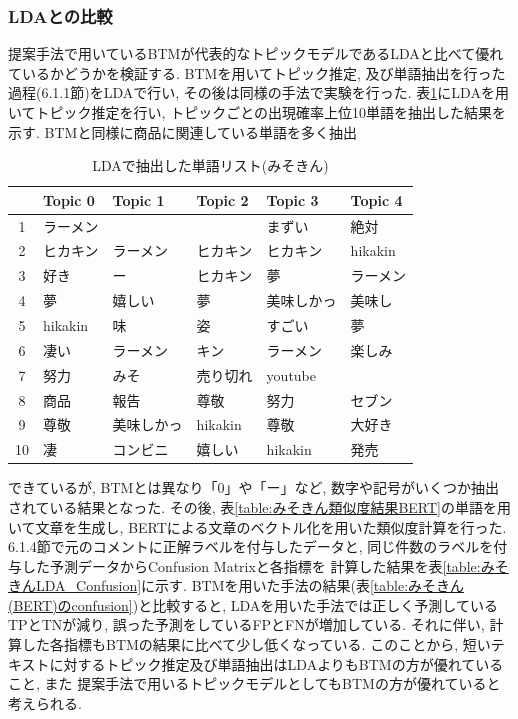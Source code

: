 \documentclass{ltjarticle}
\begin{document}
\subsubsection{LDAとの比較}
提案手法で用いているBTMが代表的なトピックモデルであるLDAと比べて優れているかどうかを検証する. 
BTMを用いてトピック推定, 及び単語抽出を行った過程(6.1.1節)をLDAで行い, その後は同様の手法で実験を行った. 
表\ref{table:みそきん単語結果LDA}にLDAを用いてトピック推定を行い, トピックごとの出現確率上位10単語を抽出した結果を示す. 
BTMと同様に商品に関連している単語を多く抽出
\begin{table}[h]
    \caption{LDAで抽出した単語リスト(みそきん)}
    \vspace{5truept}

    \centering
    \begin{tabular}{|c|>{\centering}p{6em}|>{\centering}p{6em}|>{\centering}p{6em}|>{\centering}p{6em}|>{\centering\arraybackslash}p{6em}|}
        \hline
        & Topic 0 & Topic 1 & Topic 2 & Topic 3 & Topic 4\\
        \hline\hline
        1 & ラーメン & 0 & 0 & まずい & 絶対\\
        \hline
        2 & ヒカキン & ラーメン & ヒカキン & ヒカキン & hikakin\\
        \hline
        3 & 好き & ー & ヒカキン & 夢 & ラーメン\\
        \hline
        4 & 夢 & 嬉しい & 夢 & 美味しかっ & 美味し\\
        \hline
        5 & hikakin & 味 & 姿 & すごい & 夢\\
        \hline
        6 & 凄い & ラーメン & キン & ラーメン & 楽しみ\\
        \hline
        7 & 努力 & みそ & 売り切れ & youtube & 0\\
        \hline
        8 & 商品 & 報告 & 尊敬 & 努力 & セブン\\
        \hline
        9 & 尊敬 & 美味しかっ & hikakin & 尊敬 & 大好き\\
        \hline
        10 & 凄 & コンビニ & 嬉しい & hikakin & 発売\\
        \hline
    \end{tabular}
    \label{table:みそきん単語結果LDA}
\end{table}
できているが, BTMとは異なり「0」や「ー」など, 数字や記号がいくつか抽出されている結果となった. 
その後, 表\ref{table:みそきん類似度結果BERT}の単語を用いて文章を生成し, BERTによる文章のベクトル化を用いた類似度計算を行った. 
6.1.4節で元のコメントに正解ラベルを付与したデータと, 同じ件数のラベルを付与した予測データからConfusion Matrixと各指標を
計算した結果を表\ref{table:みそきんLDA_Confusion}に示す. 
BTMを用いた手法の結果(表\ref{table:みそきん(BERT)のconfusion})と比較すると, LDAを用いた手法では正しく予測している
TPとTNが減り, 誤った予測をしているFPとFNが増加している. 
それに伴い, 計算した各指標もBTMの結果に比べて少し低くなっている. 
このことから, 短いテキストに対するトピック推定及び単語抽出はLDAよりもBTMの方が優れていること, また
提案手法で用いるトピックモデルとしてもBTMの方が優れていると考えられる. 
\end{document}
